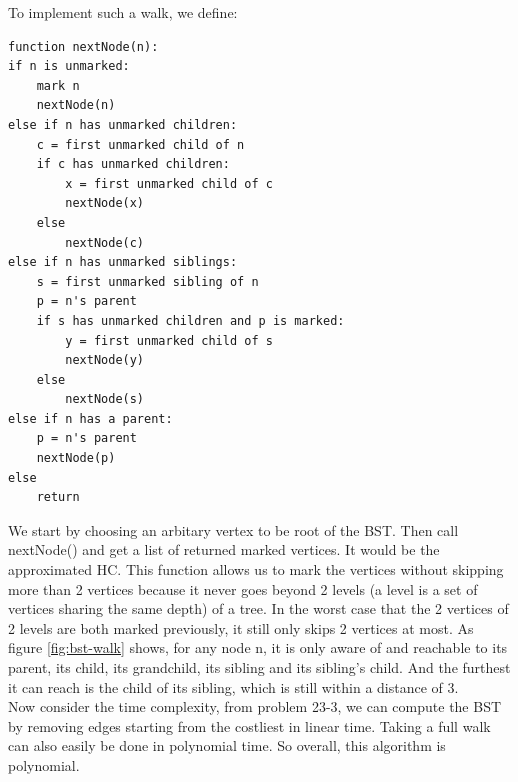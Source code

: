 \documentclass[titlepage, paper=a4, fontsize=11pt]{scrartcl} %
\numberwithin{equation}{section} %
\numberwithin{figure}{section} %
\numberwithin{table}{section} %
\numberwithin{figure}{section}
\begin{document}
To implement such a walk, we define:
\begin{verbatim}
function nextNode(n):
if n is unmarked:
    mark n
    nextNode(n)
else if n has unmarked children:
    c = first unmarked child of n
    if c has unmarked children:
        x = first unmarked child of c
        nextNode(x)
    else
        nextNode(c)
else if n has unmarked siblings:
    s = first unmarked sibling of n
    p = n's parent
    if s has unmarked children and p is marked:
        y = first unmarked child of s
        nextNode(y)
    else
        nextNode(s)
else if n has a parent:
    p = n's parent
    nextNode(p)
else
    return
\end{verbatim}
We start by choosing an arbitary vertex to be root of the BST. Then call nextNode() and get a list of returned marked vertices. It would be the approximated HC. This function allows us to mark the vertices without skipping more than 2 vertices because it never goes beyond 2 levels (a level is a set of vertices sharing the same depth) of a tree. In the worst case that the 2 vertices of 2 levels are both marked previously, it still only skips 2 vertices at most. As figure \ref{fig:bst-walk} shows, for any node n, it is only aware of and reachable to its parent, its child, its grandchild, its sibling and its sibling's child. And the furthest it can reach is the child of its sibling, which is still within a distance of 3. \\

Now consider the time complexity, from problem 23-3, we can compute the BST by removing edges starting from the costliest in linear time. Taking a full walk can also easily be done in polynomial time. So overall, this algorithm is polynomial. \\
\end{document}
